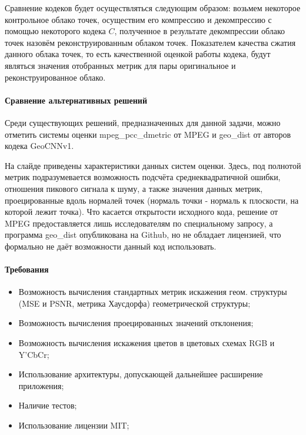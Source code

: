 \documentclass[a4paper,12pt]{extreport}
\begin{document}
Сравнение кодеков будет осуществляться следующим образом: возьмем некоторое
контрольное облако точек, осуществим его компрессию и декомпрессию с помощью
некоторого кодека $C$, полученное в результате декомпрессии облако точек назовём
реконструированным облаком точек. Показателем качества сжатия данного облака
точек, то есть качественной оценкой работы кодека, будут являться значения
отобранных метрик для пары оригинальное и реконструированное облако.

\paragraph{Сравнение альтернативных решений}

Среди существующих решений, предназначенных для данной задачи, можно отметить
системы оценки mpeg\_pcc\_dmetric от MPEG и geo\_dist от авторов кодека
GeoCNNv1.

На слайде приведены характеристики данных систем оценки. Здесь, под полнотой
метрик подразумевается возможность подсчёта среднеквадратичной ошибки, отношения
пикового сигнала к шуму, а также значения данных метрик, проецированные вдоль
нормалей точек (нормаль точки - нормаль к плоскости, на которой лежит точка).
Что касается открытости исходного кода, решение от MPEG предоставляется лишь
исследователям по специальному запросу, а программа geo\_dist опубликована на
Github, но не обладает лицензией, что формально не даёт возможности данный код
использовать.

\paragraph{Требования}

\begin{itemize}
    \item Возможность вычисления стандартных метрик искажения геом. структуры (MSE и PSNR,
    метрика Хаусдорфа) геометрической структуры;
    \item Возможность вычисления проецированных значений отклонения;
    \item Возможность вычисления искажения цветов в цветовых схемах RGB и Y'CbCr;
    \item Использование архитектуры, допускающей дальнейшее расширение
    приложения;
    \item Наличие тестов;
    \item Использование лицензии MIT;
\end{itemize}
\end{document}
